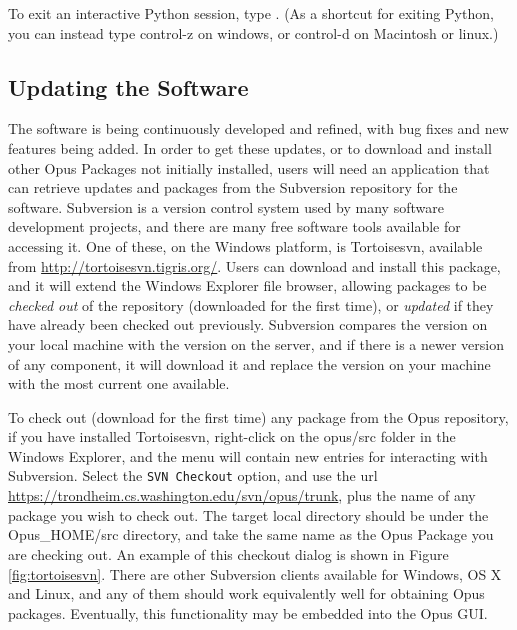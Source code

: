 To exit an interactive Python session, type .  (As a shortcut
for exiting Python, you can instead type control-z on windows, or control-d
on Macintosh or linux.)

\subsection{Updating the Software}

The software is being continuously developed and refined, with bug fixes
and new features being added.  In order to get these updates, or to
download and install other Opus Packages not initially installed, users
will need an application that can retrieve updates and packages from the
Subversion repository for the software.  Subversion is a version control
system used by many software development projects, and there are many free
software tools available for accessing it.  One of these, on the Windows
platform, is Tortoisesvn, available from \url{http://tortoisesvn.tigris.org/}.
Users can download and install this package, and it will extend the Windows
Explorer file browser, allowing packages to be \emph{checked out} of the
repository (downloaded for the first time), or \emph{updated} if they have
already been checked out previously.  Subversion compares the version on
your local machine with the version on the server, and if there is a newer
version of any component, it will download it and replace the version on
your machine with the most current one available.

To check out (download for the first time) any package from the Opus
repository, if you have installed Tortoisesvn, right-click on the opus/src
folder in the Windows Explorer, and the menu will contain new entries for
interacting with Subversion.  Select the \verb#SVN Checkout# option, and
use the url \url{https://trondheim.cs.washington.edu/svn/opus/trunk},
plus the name of any package you wish to check out.  The target local
directory should be under the Opus\_HOME/src directory, and take the same
name as the Opus Package you are checking out.  An example of this checkout
dialog is shown in Figure \ref{fig:tortoisesvn}.  There are other
Subversion clients available for Windows, OS X and Linux, and any of them
should work equivalently well for obtaining Opus packages.  Eventually,
this functionality may be embedded into the Opus GUI.

